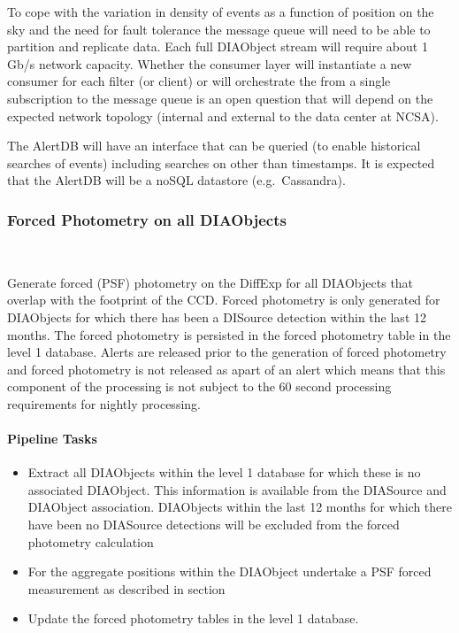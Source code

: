 To cope with the variation in density of events as a function of position on the sky and the need for fault tolerance the message queue will need to be able to partition and replicate data. Each full DIAObject stream will require about 1 Gb/s network capacity. Whether the consumer layer will instantiate a new consumer for each filter (or client) or will orchestrate the \VOEvents from a single subscription to the message queue is an open question that will depend on the expected network topology (internal and external to the data center at NCSA).

The AlertDB will have an interface that can be queried (to enable historical searches of events) including searches on other than timestamps. It is expected that the AlertDB will be a noSQL datastore (e.g.\ Cassandra).



\subsubsection{Forced Photometry on all DIAObjects}~

Generate forced (PSF) photometry on the DiffExp for all DIAObjects that overlap with the footprint of the CCD. Forced photometry is only generated for DIAObjects for which there has been a DISource detection within the last 12 months. The forced photometry is persisted in the forced photometry table in the level 1 database. Alerts are released prior to the generation of forced photometry and forced photometry is not released as apart of an alert which means that this component of the processing is not subject to the 60 second processing requirements for nightly processing.

\paragraph{Pipeline Tasks}
\begin{itemize}
\item Extract all DIAObjects within the level 1 database for which these is no associated DIAObject. This information is available from the DIASource and DIAObject association.  DIAObjects within the last 12 months for which there have been no DIASource detections will be excluded from the forced photometry calculation
\item For the aggregate positions within the DIAObject undertake a PSF forced measurement as described in section \hyperref[sec:acForcedMeasurement]{}
\item Update the forced photometry tables in the level 1 database.
\end{itemize}




